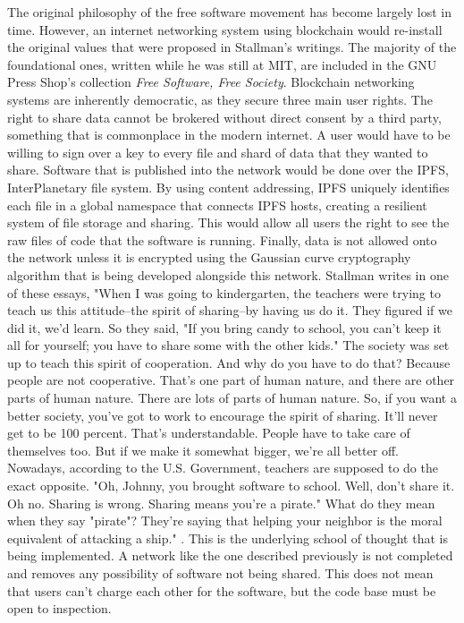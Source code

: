 \documentclass{article}
\begin{document}
    The original philosophy of the free software movement has become largely lost in time. However, an internet networking system using blockchain would re-install the original values that were proposed in Stallman's writings. The majority of the foundational ones, written while he was still at MIT, are included in the GNU Press Shop's collection \textit{Free Software, Free Society}. Blockchain networking systems are inherently democratic, as they secure three main user rights. The right to share data cannot be brokered without direct consent by a third party, something that is commonplace in the modern internet. A user would have to be willing to sign over a key to every file and shard of data that they wanted to share. Software that is published into the network would be done over the IPFS, InterPlanetary file system. By using content addressing, IPFS uniquely identifies each file in a global namespace that connects IPFS hosts, creating a resilient system of file storage and sharing. This would allow all users the right to see the raw files of code that the software is running. Finally, data is not allowed onto the network unless it is encrypted using the Gaussian curve cryptography algorithm that is being developed alongside this network. Stallman writes in one of these essays, 
    "When I was going to kindergarten, the teachers were trying to teach us this attitude–the spirit of sharing–by having us do it. They figured if we did it, we’d learn. So they said, "If you bring candy to school, you can’t keep it all for yourself; you have to share some with the other kids." The society was set up to teach this spirit of cooperation. And why do you have to do that? Because people are not cooperative. That’s one part of human nature, and there are other parts of human nature. There are lots of parts of human nature. So, if you want a better society, you’ve got to work to encourage the spirit of sharing. It’ll never get to be 100 percent. That’s understandable. People have to take care of themselves too. But if we make it somewhat bigger, we’re all better off. Nowadays, according to the U.S. Government, teachers are supposed to do the exact opposite. "Oh, Johnny, you brought software to school. Well, don’t share it. Oh no. Sharing is wrong. Sharing means you’re a pirate." What do they mean when they say "pirate"? They’re saying that helping your neighbor is the moral
equivalent of attacking a ship." \cite{RMS}. This is the underlying school of thought that is being implemented. A network like the one described previously is not completed and removes any possibility of software not being shared. This does not mean that users can't charge each other for the software, but the code base must be open to inspection. 
\end{document}
